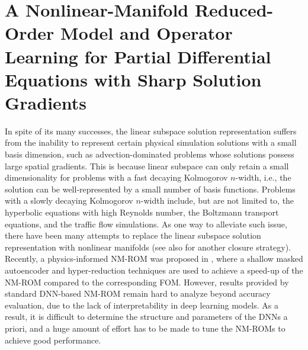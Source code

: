 \chapter{A Nonlinear-Manifold Reduced-Order Model and Operator Learning for Partial Differential Equations with Sharp Solution Gradients}
\label{chap:cnnae}

In spite of its many successes, the linear subspace solution representation suffers from the inability to represent certain physical simulation solutions with a small basis dimension, such as advection-dominated problems whose solutions possess large spatial gradients. This is because linear subspace can only retain a small dimensionality for problems with a fast decaying Kolmogorov $n$-width, i.e., the solution can be well-represented by a small number of basis functions. Problems with a slowly decaying Kolmogorov $n$-width include, but are not limited to, the hyperbolic equations with high Reynolds number, the Boltzmann transport equations, and the traffic flow simulations. As one way to alleviate such issue, there have been many attempts to replace the linear subspace solution representation with nonlinear manifolds (see also \cite{BARNETT2023112420} for another closure strategy). Recently, a physics-informed NM-ROM was proposed in \cite{kim2022fast}, where a shallow masked autoencoder and hyper-reduction techniques are used to achieve a speed-up of the NM-ROM compared to the corresponding FOM. However, results provided by standard DNN-based NM-ROM remain hard to analyze beyond accuracy evaluation, due to the lack of interpretability in deep learning models. As a result, it is difficult to determine the structure and parameters of the DNNs a priori, and a huge amount of effort has to be made to tune the NM-ROMs to achieve good performance. 

